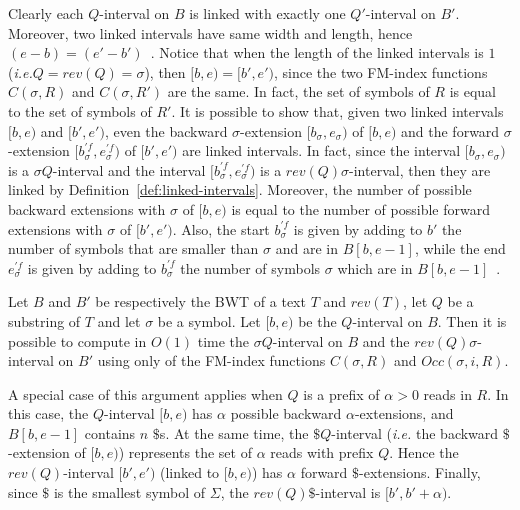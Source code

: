 \documentclass[runningheads,envcountsame,a4paper]{llncs}
\newcommand{\ie}{\textit{i.e.}\xspace}
\begin{document}
Clearly each $Q$-interval on $B$ is linked with exactly one $Q'$-interval on $B'$.
Moreover, two linked intervals have same width and length, hence $(e-b)=(e'-b')$~\cite{Lam2009,Simpson2010}.
Notice that when the length of the linked intervals is $1$ (\ie $Q=rev(Q)=\sigma$), then $[b,e)=[b',e')$,
since the two FM-index functions $C(\sigma, R)$ and $C(\sigma, R')$ are the same.
In fact, the set of symbols of $R$ is equal to the set of symbols of $R'$.
It is possible to show that, given two linked intervals $[b,e)$ and $[b',e')$, even the backward $\sigma$-extension $[b_{\sigma},e_{\sigma})$ of $[b,e)$ and the forward $\sigma$-extension $[b^{'f}_{\sigma},e^{'f}_{\sigma})$ of $[b',e')$ are linked intervals.
In fact, since the interval $[b_{\sigma},e_{\sigma})$ is a $\sigma Q$-interval and the interval $[b^{'f}_{\sigma},e^{'f}_{\sigma})$ is a $rev(Q) \sigma$-interval, then they are linked by Definition~\ref{def:linked-intervals}.
Moreover, the number of possible backward extensions with $\sigma$ of $[b,e)$ is equal to the number of possible forward extensions with $\sigma$ of $[b',e')$.
Also,  the start $b^{'f}_{\sigma}$ is given by adding to $b'$ the number of symbols that are smaller than $\sigma$ and are in $B[b,e-1]$,
while the end $e^{'f}_{\sigma}$ is given by adding to $b^{'f}_{\sigma}$ the number of symbols $\sigma$ which are in $B[b,e-1]$~\cite{Simpson2010}.

\begin{proposition}
\label{proposition:linked-intervals}
Let $B$ and $B'$ be respectively the BWT of a text $T$ and $rev(T)$, let $Q$ be a substring of $T$ and let $\sigma$ be a symbol.
Let $[b,e)$ be the $Q$-interval on $B$.
Then it is possible to compute in $O(1)$ time the $\sigma Q$-interval on $B$ and the $rev(Q) \sigma$-interval on $B'$
using only of the FM-index functions $C(\sigma, R)$ and $Occ(\sigma, i, R)$.
\end{proposition}

A special case of this argument applies when
$Q$ is a prefix of $\alpha > 0$ reads in $R$.
In this case, the $Q$-interval $[b,e)$ has $\alpha$ possible backward $\alpha$-extensions, and  $B[b,e-1]$ contains $n$ $\$$s.
At the same time, the $\$ Q$-interval (\ie the backward $\$$-extension of $[b,e)$) represents the set of $\alpha$ reads with prefix $Q$.
Hence the $rev(Q)$-interval $[b',e')$ (linked to $[b,e)$) has $\alpha$ forward $\$$-extensions.
Finally, since $\$$ is the smallest symbol of $\Sigma$, the $rev(Q) \$$-interval is $[b',b'+\alpha)$.


\end{document}
